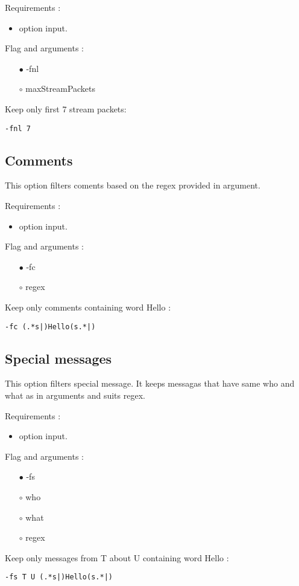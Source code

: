 \documentclass[english]{article}
\begin{document}
\noindent Requirements : 
\begin{itemize}
\item option input. 
\end{itemize}
Flag and arguments :
\begin{itemize}
\item[$\bullet$] -fnl
\item[$\circ$] maxStreamPackets
\end{itemize}
Keep only first 7 stream packets: 
\begin{lstlisting} 
-fnl 7
\end{lstlisting}


\subsection{Comments}
This option filters coments based on the regex provided in argument.

\noindent Requirements : 
\begin{itemize}
\item option input. 
\end{itemize}
Flag and arguments : 

\begin{itemize}
\item[$\bullet$] -fc
\item[$\circ$] regex
\end{itemize}
Keep only comments containing word Hello : 
\begin{lstlisting} 
-fc (.*s|)Hello(s.*|)
\end{lstlisting}


\subsection{Special messages}
This option filters special message. It keeps messagas that have same who and what as in arguments and suits regex.  

\noindent Requirements : 
\begin{itemize}
\item option input. 
\end{itemize}
Flag and arguments :
\begin{itemize}
\item[$\bullet$] -fs
\item[$\circ$] who
\item[$\circ$] what
\item[$\circ$] regex
\end{itemize}
Keep only messages from T about U containing word Hello : 
\begin{lstlisting} 
-fs T U (.*s|)Hello(s.*|)
\end{lstlisting}
\end{document}
